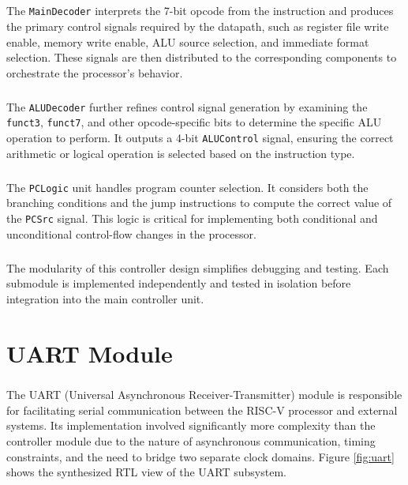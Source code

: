 \documentclass[12pt]{report}
\begin{document}
\paragraph{}
The \texttt{MainDecoder} interprets the 7-bit opcode from the instruction and produces the primary control signals required by the datapath, such as register file write enable, memory write enable, ALU source selection, and immediate format selection. These signals are then distributed to the corresponding components to orchestrate the processor's behavior.

\paragraph{}
The \texttt{ALUDecoder} further refines control signal generation by examining the \texttt{funct3}, \texttt{funct7}, and other opcode-specific bits to determine the specific ALU operation to perform. It outputs a 4-bit \texttt{ALUControl} signal, ensuring the correct arithmetic or logical operation is selected based on the instruction type.

\paragraph{}
The \texttt{PCLogic} unit handles program counter selection. It considers both the branching conditions and the jump instructions to compute the correct value of the \texttt{PCSrc} signal. This logic is critical for implementing both conditional and unconditional control-flow changes in the processor.

\paragraph{}
The modularity of this controller design simplifies debugging and testing. Each submodule is implemented independently and tested in isolation before integration into the main controller unit.


\chapter{UART Module}

\paragraph{}
The UART (Universal Asynchronous Receiver-Transmitter) module is responsible for facilitating serial communication between the RISC-V processor and external systems. Its implementation involved significantly more complexity than the controller module due to the nature of asynchronous communication, timing constraints, and the need to bridge two separate clock domains. Figure \ref{fig:uart} shows the synthesized RTL view of the UART subsystem.
\end{document}
